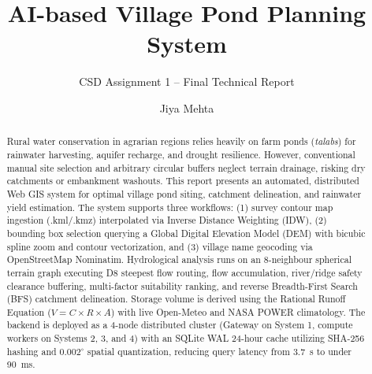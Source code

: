\documentclass[manuscript,screen,review]{acmart}
\begin{document}
\title{AI-based Village Pond Planning System}
\subtitle{CSD Assignment 1 -- Final Technical Report}

\author{Jiya Mehta}

\renewcommand{\shortauthors}{Mehta}

\begin{abstract}
Rural water conservation in agrarian regions relies heavily on farm ponds (\textit{talabs}) for rainwater harvesting, aquifer recharge, and drought resilience. However, conventional manual site selection and arbitrary circular buffers neglect terrain drainage, risking dry catchments or embankment washouts. This report presents an automated, distributed Web GIS system for optimal village pond siting, catchment delineation, and rainwater yield estimation. The system supports three workflows: (1) survey contour map ingestion (.kml/.kmz) interpolated via Inverse Distance Weighting (IDW), (2) bounding box selection querying a Global Digital Elevation Model (DEM) with bicubic spline zoom and contour vectorization, and (3) village name geocoding via OpenStreetMap Nominatim. Hydrological analysis runs on an 8-neighbour spherical terrain graph executing D8 steepest flow routing, flow accumulation, river/ridge safety clearance buffering, multi-factor suitability ranking, and reverse Breadth-First Search (BFS) catchment delineation. Storage volume is derived using the Rational Runoff Equation ($V = C \times R \times A$) with live Open-Meteo and NASA POWER climatology. The backend is deployed as a 4-node distributed cluster (Gateway on System 1, compute workers on Systems 2, 3, and 4) with an SQLite WAL 24-hour cache utilizing SHA-256 hashing and $0.002^\circ$ spatial quantization, reducing query latency from 3.7~s to under 90~ms.
\end{abstract}


\maketitle

\end{document}

